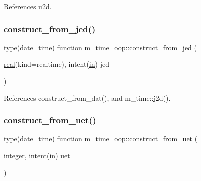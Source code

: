 References u2d.

\mbox{\label{namespacem__time__oop_ac7d9aa1885c2b8df613541be8a147064}} 
\subsubsection{\texorpdfstring{construct\+\_\+from\+\_\+jed()}{construct\_from\_jed()}}
{\footnotesize\ttfamily \hyperlink{stop__watch_83_8txt_a70f0ead91c32e25323c03265aa302c1c}{type}(\hyperlink{structm__time__oop_1_1date__time}{date\+\_\+time}) function m\+\_\+time\+\_\+oop\+::construct\+\_\+from\+\_\+jed (\begin{DoxyParamCaption}\item[{\hyperlink{read__watch_83_8txt_abdb62bde002f38ef75f810d3a905a823}{real}(kind=realtime), intent(\hyperlink{M__journal_83_8txt_afce72651d1eed785a2132bee863b2f38}{in})}]{jed }\end{DoxyParamCaption})\hspace{0.3cm}{\ttfamily [private]}}



References construct\+\_\+from\+\_\+dat(), and m\+\_\+time\+::j2d().

\mbox{\label{namespacem__time__oop_ae952d7599526f1b2632452d00363add3}} 
\subsubsection{\texorpdfstring{construct\+\_\+from\+\_\+uet()}{construct\_from\_uet()}}
{\footnotesize\ttfamily \hyperlink{stop__watch_83_8txt_a70f0ead91c32e25323c03265aa302c1c}{type}(\hyperlink{structm__time__oop_1_1date__time}{date\+\_\+time}) function m\+\_\+time\+\_\+oop\+::construct\+\_\+from\+\_\+uet (\begin{DoxyParamCaption}\item[{integer, intent(\hyperlink{M__journal_83_8txt_afce72651d1eed785a2132bee863b2f38}{in})}]{uet }\end{DoxyParamCaption})\hspace{0.3cm}{\ttfamily [private]}}



